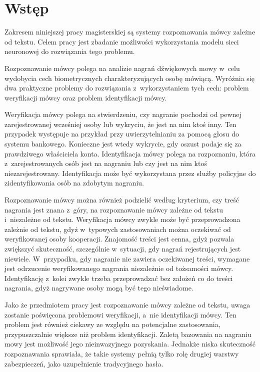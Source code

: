 \chapter{Wstęp}\label{chap:wstep}

Zakresem niniejszej pracy magisterskiej są systemy rozpoznawania mówcy zależne od tekstu. Celem
pracy jest zbadanie możliwości wykorzystania modelu sieci neuronowej do rozwiązania tego problemu.

Rozpoznawanie mówcy polega na analizie nagrań dźwiękowych mowy w~celu wydobycia cech biometrycznych
charakteryzujących osobę mówiącą. Wyróżnia się dwa praktyczne problemy do rozwiązania z~wykorzystaniem tych
cech: problem weryfikacji mówcy oraz problem identyfikacji mówcy.

Weryfikacja mówcy polega na stwierdzeniu, czy nagranie pochodzi od pewnej zarejestrowanej wcześniej osoby
lub wykryciu, że jest na nim ktoś inny. Ten przypadek występuje na przykład przy uwierzytelnianiu za pomocą głosu
do systemu bankowego. Konieczne jest wtedy wykrycie, gdy oszust podaje się za prawdziwego właściciela konta.
Identyfikacja mówcy polega na rozpoznaniu, która z~zarejestrowanych osób jest na nagraniu lub czy
jest na nim ktoś niezarejestrowany. Identyfikacja może być wykorzystana przez służby policyjne do
zidentyfikowania osób na zdobytym nagraniu.

Rozpoznawanie mówcy można również podzielić według kryterium, czy treść nagrania jest znana z~góry,
na rozpoznawanie mówcy zależne od tekstu i~niezależne od tekstu. Weryfikacja mówcy zwykle może
być przeprowadzona zależnie od tekstu, gdyż w~typowych zastosowaniach można oczekiwać od weryfikowanej
osoby kooperacji. Znajomość treści jest cenna, gdyż pozwala zwiększyć skuteczność, szczególnie w~sytuacji,
gdy nagrań rejestrujących jest niewiele\cite{parallelSpeakerAnd}. W~przypadku,
gdy nagranie nie zawiera oczekiwanej treści, wymagane jest odrzucenie weryfikowanego nagrania
niezależnie od tożsamości mówcy.
Identyfikację z~kolei zwykle trzeba przeprowadzać bez założeń co do treści nagrania, gdyż nagrywane osoby mogą
być tego nieświadome.

Jako że przedmiotem pracy jest rozpoznawanie mówcy zależne od tekstu, uwaga zostanie poświęcona problemowi
weryfikacji, a~nie identyfikacji mówcy. Ten problem jest również ciekawy ze względu na potencjalne zastosowania,
przypuszczalnie większe niż problem identyfikacji. Zaletą bazowania na nagraniu mowy jest możliwość
jego nieinwazyjnego pozyskania. Jednakże niska skuteczność rozpoznawania sprawiała, że takie systemy
pełnią tylko rolę drugiej warstwy zabezpieczeń, jako uzupełnienie tradycyjnego hasła.


